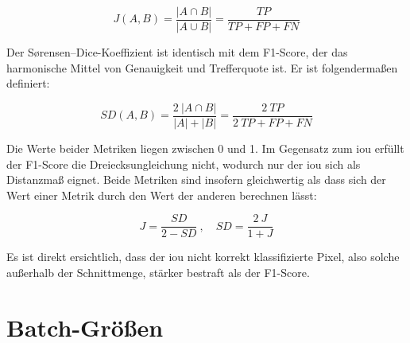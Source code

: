 \begin{equation}
J(A, B) = \frac{| A \cap B |}{| A \cup B |} = \frac{TP}{TP + FP + FN}
\end{equation}

Der Sørensen–Dice-Koeffizient ist identisch mit dem F1-Score, der das harmonische Mittel von Genauigkeit und Trefferquote ist.
Er ist folgendermaßen definiert:

\begin{equation}
SD(A, B) = \frac{2 \ | A \cap B |}{| A | + | B |} = \frac{2 \ TP}{2 \ TP + FP + FN}
\end{equation}

Die Werte beider Metriken liegen zwischen 0 und 1.
Im Gegensatz zum \gls{iou} erfüllt der F1-Score die Dreiecksungleichung nicht, wodurch nur der \gls{iou} sich als Distanzmaß eignet.
Beide Metriken sind insofern gleichwertig als dass sich der Wert einer Metrik durch den Wert der anderen berechnen lässt:

\begin{equation}
J = \frac{SD}{2 - SD} \ , \quad SD = \frac{2 \ J}{1 + J}
\end{equation}

Es ist direkt ersichtlich, dass der \gls{iou} nicht korrekt klassifizierte Pixel, also solche außerhalb der Schnittmenge, stärker bestraft als der F1-Score.



\section{Batch-Größen}


